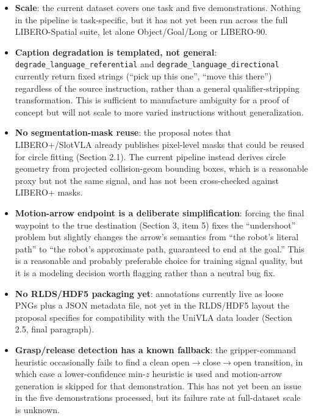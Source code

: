 \documentclass[11pt]{article}
\begin{document}
\begin{itemize}[nosep]
  \item \textbf{Scale}: the current dataset covers one task and five demonstrations. Nothing in the pipeline is task-specific, but it has not yet been run across the full LIBERO-Spatial suite, let alone Object/Goal/Long or LIBERO-90.
  \item \textbf{Caption degradation is templated, not general}: \texttt{degrade\_language\_referential} and \texttt{degrade\_language\_directional} currently return fixed strings (``pick up this one'', ``move this there'') regardless of the source instruction, rather than a general qualifier-stripping transformation. This is sufficient to manufacture ambiguity for a proof of concept but will not scale to more varied instructions without generalization.
  \item \textbf{No segmentation-mask reuse}: the proposal notes that LIBERO+/SlotVLA already publishes pixel-level masks that could be reused for circle fitting (Section 2.1). The current pipeline instead derives circle geometry from projected collision-geom bounding boxes, which is a reasonable proxy but not the same signal, and has not been cross-checked against LIBERO+ masks.
  \item \textbf{Motion-arrow endpoint is a deliberate simplification}: forcing the final waypoint to the true destination (Section 3, item 5) fixes the ``undershoot'' problem but slightly changes the arrow's semantics from ``the robot's literal path'' to ``the robot's approximate path, guaranteed to end at the goal.'' This is a reasonable and probably preferable choice for training signal quality, but it is a modeling decision worth flagging rather than a neutral bug fix.
  \item \textbf{No RLDS/HDF5 packaging yet}: annotations currently live as loose PNGs plus a JSON metadata file, not yet in the RLDS/HDF5 layout the proposal specifies for compatibility with the UniVLA data loader (Section 2.5, final paragraph).
  \item \textbf{Grasp/release detection has a known fallback}: the gripper-command heuristic occasionally fails to find a clean open$\to$close$\to$open transition, in which case a lower-confidence min-$z$ heuristic is used and motion-arrow generation is skipped for that demonstration. This has not yet been an issue in the five demonstrations processed, but its failure rate at full-dataset scale is unknown.
\end{itemize}
\end{document}
